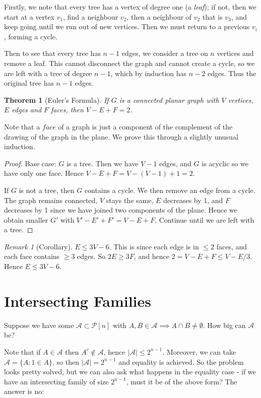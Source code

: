 \documentclass[]{article}
\theoremstyle{custhm}
\theoremstyle{cusdef}
\theoremstyle{custhm}
\theoremstyle{custhm}
\theoremstyle{custhm}
\theoremstyle{custhm}
\newtheorem*{theorem*}{Theorem}
\theoremstyle{cusdef}
\theoremstyle{remark}
\newtheorem*{remark*}{Remark}
\theoremstyle{custhm}
\renewcommand{\it}[1]{\textit{#1}}
\newcommand{\A}{\mathcal{A}}
\begin{document}
Firstly, we note that every tree has a vertex of degree one (a \it{leaf}); if not, then we start at a vertex $v_1$, find a neighbour $v_2$, then a neighbour of $v_2$ that is $v_3$, and keep going until we run out of new vertices. Then we must return to a previous $v_i$, forming a cycle.

Then to see that every tree has $n-1$ edges, we consider a tree on $n$ vertices and remove a leaf. This cannot disconnect the graph and cannot create a cycle, so we are left with a tree of degree $n-1$, which by induction has $n-2$ edges. Thus the original tree has $n-1$ edges.

\begin{theorem*}[Euler's Formula]
If $G$ is a connected planar graph with $V$ vertices, $E$ edges and $F$ faces, then $V - E + F = 2$.
\end{theorem*}
Note that a $\it{face}$ of a graph is just a component of the complement of the drawing of the graph in the plane. We prove this through a slightly unusual induction.

\begin{proof}
Base case: $G$ is a tree. Then we have $V-1$ edges, and $G$ is acyclic so we have only one face. Hence $V - E + F = V - (V-1) + 1 = 2$.

If $G$ is not a tree, then $G$ contains a cycle. We then remove an edge from a cycle. The graph remains connected, $V$ stays the same, $E$ decreases by 1, and $F$ decreases by 1 since we have joined two components of the plane. Hence we obtain smaller $G'$ with $V' - E' + F' = V - E + F$. Continue until we are left with a tree.
\end{proof}

\begin{remark*}[Corollary]
$E \le 3V - 6$. This is since each edge is in $\le 2$ faces, and each face contains $\ge 3 $ edges. So $2E \ge 3F$, and hence $2 = V - E + F \le V  - E/3$. Hence $E \le 3V - 6$.
\end{remark*}


\section{Intersecting Families}

Suppose we have some $\A\subset \mathcal{P}[n]$ with $A,B\in \A\implies A\cap B \ne \emptyset$. How big can $\A$ be?

Note that if $A\in \A$ then $A^{c}\not\in \A$, hence $|\A|\le 2^{n-1}$. Moreover, we can take $\A = \{A:1\in A\}$, so then $|\A| = 2^{n-1}$ and equality is achieved. So the problem looks pretty solved, but we can also ask what happens in the equality case - if we have an intersecting family of size $2^{n-1}$, must it be of the above form? The answer is no:
\end{document}
